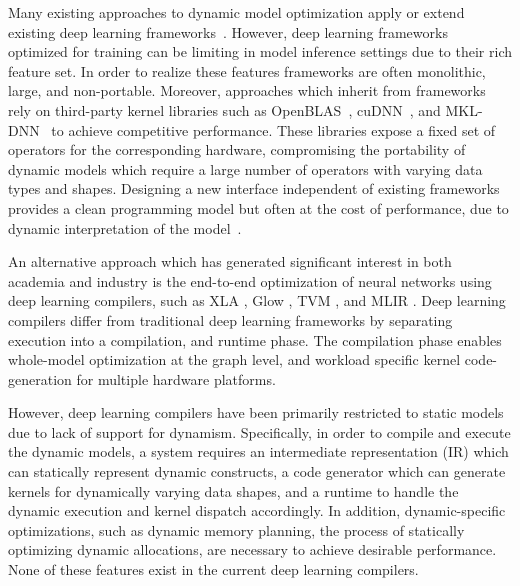 Many existing approaches to dynamic model optimization apply or extend existing deep learning frameworks~\citep{xu2018cavs, gao2018low, yu2018dynamic, jeong2018improving, jeong2019janus, dynet, tf_fold}.
However, deep learning frameworks optimized for training can be limiting in model inference settings due to their rich feature set. In order to realize these features frameworks are often monolithic, large, and non-portable.
Moreover, approaches which inherit from frameworks rely on third-party kernel libraries such as OpenBLAS~\citep{xianyi2014openblas}, cuDNN~\citep{cudnn}, and MKL-DNN~\citep{mkldnn} to achieve competitive performance. These libraries expose a fixed set of operators for the corresponding hardware, compromising the portability of dynamic models which require a large number of operators with varying data types and shapes. Designing a new interface independent of existing frameworks provides a clean programming model but often at the cost of performance, due to dynamic interpretation of the model~\citep{dynet}.

An alternative approach which has generated significant interest in both academia and industry is the end-to-end optimization of neural networks using deep learning compilers, such as XLA \citep{xla}, Glow \citep{glow}, TVM \citep{tvm_osdi18}, and MLIR \citep{lattner2020mlir}.
Deep learning compilers differ from traditional deep learning frameworks by separating execution into a compilation, and runtime phase. The compilation phase enables whole-model optimization at the graph level, and workload specific kernel code-generation for multiple hardware platforms.

However, deep learning compilers have been primarily restricted to static models due to lack of support for dynamism.
Specifically, in order to compile and execute the dynamic models, a system requires an intermediate representation (IR) which can statically represent dynamic constructs, a code generator
which can generate kernels for dynamically varying data shapes, and a runtime to handle the dynamic execution and kernel dispatch accordingly.
In addition, dynamic-specific optimizations, such as dynamic memory planning, the process of statically optimizing dynamic allocations, are necessary to achieve desirable performance.
None of these features exist in the current deep learning compilers.

